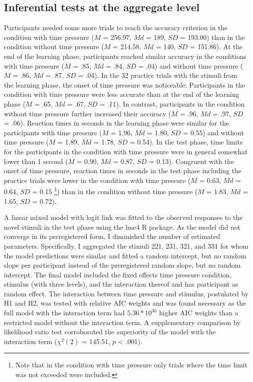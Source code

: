 \documentclass[a4paper,man,natbib]{apa6}
\begin{document}
\subsection{Inferential tests at the aggregate level}
Participants needed some more trials to reach the accuracy criterion in the condition with time pressure ($M$ = 256.97, $Md$ = 189, $SD$ = 193.00) than in the condition without time pressure ($M$ = 214.58, $Md$ = 140, $SD$ = 151.86). At the end of the learning phase, participants reached similar accuracy in the conditions with time pressure ($M$ = .85, $Md$ = .84, $SD$ = .04) and without time pressure ($M$ = .86, $Md$ = .87, $SD$ = .04). In the 32 practice trials with the stimuli from the learning phase, the onset of time pressure was noticeable: Participants in the condition with time pressure were less accurate than at the end of the learning phase ($M$ = .65, $Md$ = .67, $SD$ = .11). In contrast, participants in the condition without time pressure further increased their accuracy ($M$ = .96, $Md$ = .97, $SD$ = .06). Reaction times in seconds in the learning phase were similar for the participants with time pressure ($M$ = 1.96, $Md$ = 1.80, $SD$ = 0.55) and without time pressure ($M$ = 1.89, $Md$ = 1.78, $SD$ = 0.54). In the test phase, time limits for the participants in the condition with time pressure were in general somewhat lower than 1 second ($M$ = 0.90, $Md$ = 0.87, $SD$ = 0.13). Congruent with the onset of time pressure, reaction times in seconds in the test phase including the practice trials were lower in the condition with time pressure ($M$ = 0.63, $Md$ = 0.64, $SD$ = 0.15 \footnote{Note that in the condition with time pressure only trials where the time limit was not exceeded were included.}) than in the condition without time pressure ($M$ = 1.83, $Md$ = 1.65, $SD$ = 0.72). 

A linear mixed model with logit link was fitted to the observed responses to the novel stimuli in the test phase using the lme4 R package. As the model did not converge in its preregistered form, I diminished the number of estimated parameters. Specifically, I aggregated the stimuli 221, 231, 321, and 331 for whom the model predictions were similar and fitted a random intercept, but no random slope per participant instead of the preregistered random slope, but no random intercept. The final model included the fixed effects time pressure condition, stimulus (with three levels), and the interaction thereof and has participant as random effect. The interaction between time pressure and stimulus, postulated by H1 and H2, was tested with relative AIC weights \citep[][p. 194]{wagenmakers2004aic} and was found necessary as the full model with the interaction term had $5.36 * 10^{36}$ higher AIC weights than a restricted model without the interaction term. A supplementary comparison by likelihood ratio test corroborated the superiority of the model with the interaction term ($\chi^{2}(2)$ = 145.51, $p$ < .001). 
\end{document}
